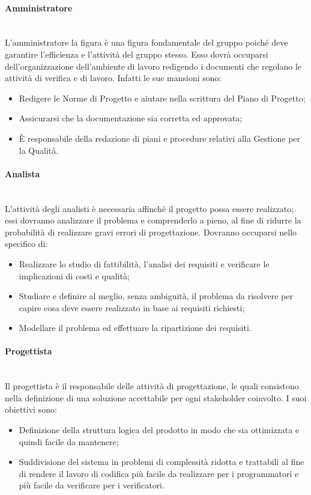 \paragraph{Amministratore}\mbox{}\\[0.4cm]
L’amministratore la figura è una figura fondamentale del gruppo poiché deve garantire l’efficienza e l’attività del gruppo stesso. Esso dovrà occuparsi dell’organizzazione dell’ambiente di lavoro redigendo i documenti che regolano le attività di verifica e di lavoro. Infatti le sue mansioni sono:
\begin{itemize}
    \item Redigere le Norme di Progetto e aiutare nella scrittura del Piano di Progetto;
    \item Assicurarsi che la documentazione sia corretta ed approvata;
    \item È responsabile della redazione di piani e procedure relativi alla Gestione per la Qualità.
\end{itemize}

\paragraph{Analista}\mbox{}\\[0.4cm]
L’attività degli analisti è necessaria affinché il progetto possa essere realizzato; essi dovranno analizzare il problema e comprenderlo a pieno, al fine di ridurre la probabilità di realizzare gravi errori di progettazione. Dovranno occuparsi nello specifico di:
\begin{itemize}
    \item Realizzare  lo studio di fattibilità, l’analisi dei requisiti e verificare le implicazioni di costi e qualità;
    \item Studiare e definire al meglio, senza ambiguità, il problema da risolvere per capire cosa deve essere realizzato in base ai requisiti richiesti;
    \item Modellare il problema ed effettuare la ripartizione dei requisiti.
\end{itemize}

\paragraph{Progettista}\mbox{}\\[0.4cm]
Il progettista è il responsabile delle attività di progettazione, le quali consistono nella definizione di una soluzione accettabile per ogni stakeholder coinvolto. I suoi obiettivi sono:
\begin{itemize}

    \item Definizione della struttura logica del prodotto in modo che sia ottimizzata e quindi facile da mantenere;
    \item Suddivisione del sistema in problemi di complessità ridotta e trattabili al fine di rendere il lavoro di codifica più facile da realizzare per i programmatori e più facile da verificare per i verificatori.
\end{itemize}

